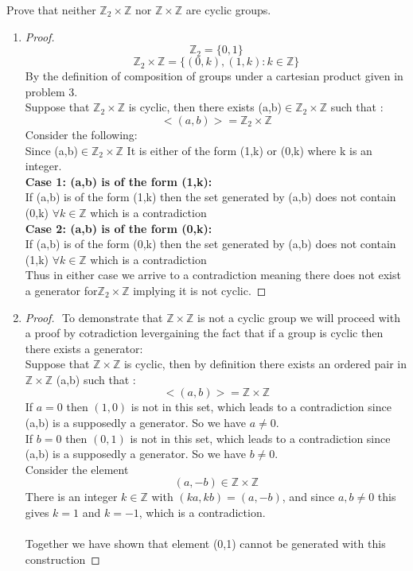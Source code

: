 \documentclass[11pt]{article}
\theoremstyle{definition}  %
\newcommand{\Z}{\mathbb{Z}}
\newcommand{\block}[2]{\begin{tcolorbox}[title={#1}]{#2}\end{tcolorbox}}
\begin{document}
\block{Question 6}{
Prove that neither $\Z_2 \times \Z$ nor $\Z \times \Z$ are cyclic groups.
}\begin{enumerate}
  \item \block{\textbf{Subproof 1: $\Z_2\times \Z$}}{
  \begin{proof}
    $ $\newline
    \[
      \Z_2=\{0,1\}
    \]
    \[
    \Z_2 \times \Z=\{(0,k),(1,k):k\in \Z\}
    \]
    By the definition of composition of groups under a cartesian product given in problem 3. \\
    Suppose that $\Z_2\times \Z$ is cyclic, then there exists (a,b)$\in \Z_2\times \Z$ such that :
    \[
      <(a,b)>=\Z_2\times \Z
    \]
    Consider the following:\\
    Since (a,b)$\in \Z_2\times \Z$ It is either of the form (1,k) or (0,k) where k is an integer.
    \\
    \textbf{Case 1: (a,b) is of the form (1,k):}\\
    If (a,b) is of the form (1,k) then the set generated by (a,b) does not contain (0,k) $\forall k \in \Z$ which is a contradiction \\
    \textbf{Case 2: (a,b) is of the form (0,k):}\\
    If (a,b) is of the form (0,k) then the set generated by (a,b) does not contain (1,k) $\forall k \in \Z$ which is a contradiction \\
    Thus in either case we arrive to a contradiction meaning there does not exist a generator for$\Z_2\times \Z$ implying it is not cyclic.
  \end{proof}}
  \item \block{\textbf{Subproof 1: $\Z\times \Z$}}{
  \newcommand{\ztz}{}
  \begin{proof}
    $ $\newline
    To demonstrate that $\Z\times \Z$ is not a cyclic group we will proceed with a proof by cotradiction levergaining the fact that if a group is cyclic then there exists a generator: \\
    Suppose that $\Z\times \Z$ is cyclic, then by definition there exists an ordered pair in $\Z\times \Z$ (a,b) such that :
    \[
      <(a,b)>=\Z \times \Z
    \]
    If $a=0$ then $(1,0)$ is not in this set, which leads to a contradiction since (a,b) is a supposedly a generator. So we have $a \neq 0$.\\
    If $b=0$ then $(0,1)$ is not in this set, which leads to a contradiction since (a,b) is a supposedly a generator. So we have $b \neq 0$.\\
    Consider the element $$(a,-b) \in \mathbb{Z} \times \mathbb{Z}$$There is an integer $k \in \mathbb{Z}$ with $(k a, k b)=(a,-b)$, and since $a, b \neq 0$ this gives $k=1$ and $k=-1$, which is a contradiction.\\\\
    Together we have shown that element (0,1) cannot be generated with this construction
  \end{proof}}
\end{enumerate}
\end{document}
